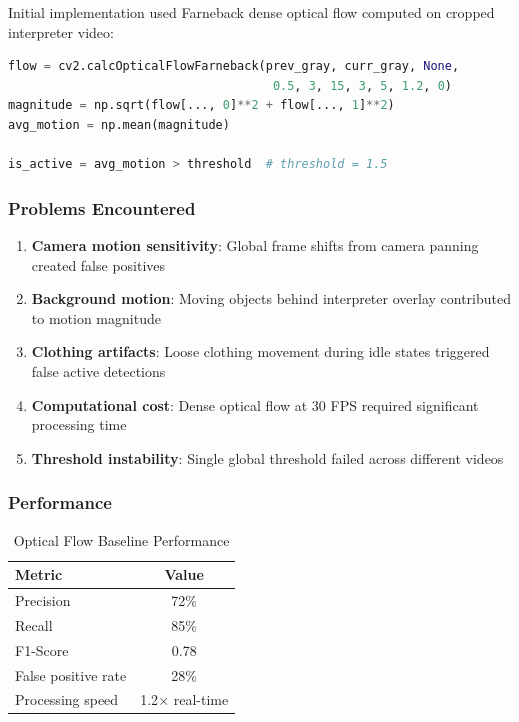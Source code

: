 \documentclass[11pt,a4paper]{article}
\begin{document}
Initial implementation used Farneback dense optical flow computed on cropped interpreter video:

\begin{lstlisting}[language=Python]
flow = cv2.calcOpticalFlowFarneback(prev_gray, curr_gray, None, 
                                     0.5, 3, 15, 3, 5, 1.2, 0)
magnitude = np.sqrt(flow[..., 0]**2 + flow[..., 1]**2)
avg_motion = np.mean(magnitude)

is_active = avg_motion > threshold  # threshold = 1.5
\end{lstlisting}

\subsubsection{Problems Encountered}

\begin{enumerate}
    \item \textbf{Camera motion sensitivity}: Global frame shifts from camera panning created false positives
    \item \textbf{Background motion}: Moving objects behind interpreter overlay contributed to motion magnitude
    \item \textbf{Clothing artifacts}: Loose clothing movement during idle states triggered false active detections
    \item \textbf{Computational cost}: Dense optical flow at 30 FPS required significant processing time
    \item \textbf{Threshold instability}: Single global threshold failed across different videos
\end{enumerate}

\subsubsection{Performance}

\begin{table}[htbp]
\centering
\caption{Optical Flow Baseline Performance}
\begin{tabular}{@{}lc@{}}
\toprule
\textbf{Metric} & \textbf{Value} \\ \midrule
Precision & 72\% \\
Recall & 85\% \\
F1-Score & 0.78 \\
False positive rate & 28\% \\
Processing speed & 1.2$\times$ real-time \\
\bottomrule
\end{tabular}
\end{table}
\end{document}
